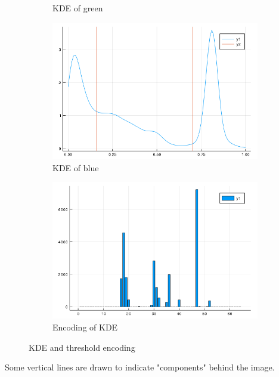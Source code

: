 \documentclass{beamer}
\begin{document}
\begin{frame}
\begin{figure}[htb]
\begin{subfigure}[b]{0.24\linewidth}
      \caption{KDE of green}
    \end{subfigure}
    \begin{subfigure}[b]{0.24\linewidth}
      \includegraphics[width=\linewidth]{images/kde_b.png}
      \caption{KDE of blue}
    \end{subfigure}
    \begin{subfigure}[b]{0.24\linewidth}
      \includegraphics[width=\linewidth]{images/kde_code.png}
      \caption{Encoding of KDE}
    \end{subfigure}
    \caption{KDE and threshold encoding}
    \label{fig:kde}
  \end{figure}  

  Some vertical lines are drawn to indicate "components" behind the image. 

\end{frame}
\end{document}
